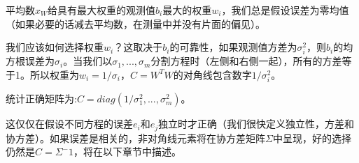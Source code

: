 	平均数$\hat{x}_W$给具有最大权重的观测值$b_i$最大的权重$w_i$，我们总是假设误差为零均值（如果必要的话减去平均数，在测量中并没有片面的偏见）。
	
	我们应该如何选择权重$w_i$？这取决于$b_i$的可靠性，如果观测值方差为$\sigma^2_i$，则$b_i$的均方根误差为$\sigma_i$。当我们以$\sigma_1,...,\sigma_m$分割方程时（左侧和右侧一起），所有的方差等于1。所以权重为$w_i=1/\sigma_i$，$C=W^TW$的对角线包含数字$1/\sigma^2_i$。
	
	统计正确矩阵为:$C=diag(1/\sigma^2_1,...,\sigma^2_m)$。
	
	这仅仅在假设不同方程的误差$e_i$和$e_j$独立时才正确（我们很快定义独立性，方差和协方差）。如果误差是相关的，非对角线元素将在协方差矩阵$\Sigma$中呈现，好的选择仍然是$C=\Sigma^-1$，将在以下章节中描述。
